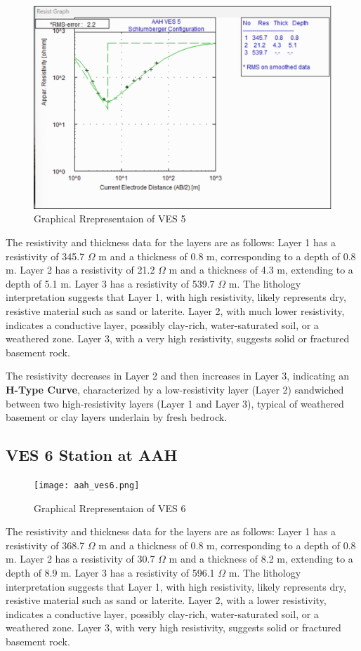 \documentclass[12pt,a4paper]{report}
\begin{document}
\begin{figure}[H]
    \centering
    \includegraphics[width=1.0\textwidth]{aah_ves5.png}
    \caption{Graphical Rrepresentaion of VES 5}
    \label{fig:AAH_VES_5_Curve}
\end{figure}
The resistivity and thickness data for the layers are as follows: Layer 1 has a resistivity of 345.7 $\Omega$ m and a thickness of 0.8 m, corresponding to a depth of 0.8 m. Layer 2 has a resistivity of 21.2 $\Omega$ m and a thickness of 4.3 m, extending to a depth of 5.1 m. Layer 3 has a resistivity of 539.7 $\Omega$ m. The lithology interpretation suggests that Layer 1, with high resistivity, likely represents dry, resistive material such as sand or laterite. Layer 2, with much lower resistivity, indicates a conductive layer, possibly clay-rich, water-saturated soil, or a weathered zone. Layer 3, with a very high resistivity, suggests solid or fractured basement rock.

The resistivity decreases in Layer 2 and then increases in Layer 3, indicating an \textbf{H-Type Curve}, characterized by a low-resistivity layer (Layer 2) sandwiched between two high-resistivity layers (Layer 1 and Layer 3), typical of weathered basement or clay layers underlain by fresh bedrock.

\subsection{VES 6 Station at AAH}

\begin{figure}[H]
    \centering
    \texttt{[image: aah\_ves6.png]}
    \caption{Graphical Rrepresentaion of VES 6}
    \label{fig:AAH_VES_6_Curve}
\end{figure}
The resistivity and thickness data for the layers are as follows: Layer 1 has a resistivity of 368.7 $\Omega$ m and a thickness of 0.8 m, corresponding to a depth of 0.8 m. Layer 2 has a resistivity of 30.7 $\Omega$ m and a thickness of 8.2 m, extending to a depth of 8.9 m. Layer 3 has a resistivity of 596.1 $\Omega$ m. The lithology interpretation suggests that Layer 1, with high resistivity, likely represents dry, resistive material such as sand or laterite. Layer 2, with a lower resistivity, indicates a conductive layer, possibly clay-rich, water-saturated soil, or a weathered zone. Layer 3, with very high resistivity, suggests solid or fractured basement rock. 
\end{document}
